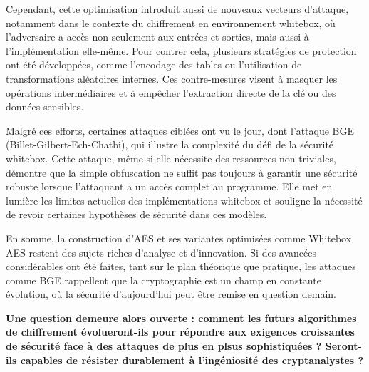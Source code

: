 \documentclass[a4paper, 10pt]{article}
\begin{document}
Cependant, cette optimisation introduit aussi de nouveaux vecteurs d’attaque, notamment dans le contexte du chiffrement en environnement whitebox, où l’adversaire a accès non seulement aux entrées et sorties, mais aussi à l’implémentation elle-même. Pour contrer cela, plusieurs stratégies de protection ont été développées, comme l’encodage des tables ou l’utilisation de transformations aléatoires internes. Ces contre-mesures visent à masquer les opérations intermédiaires et à empêcher l’extraction directe de la clé ou des données sensibles.

Malgré ces efforts, certaines attaques ciblées ont vu le jour, dont l’attaque BGE (Billet-Gilbert-Ech-Chatbi), qui illustre la complexité du défi de la sécurité whitebox. Cette attaque, même si elle nécessite des ressources non triviales, démontre que la simple obfuscation ne suffit pas toujours à garantir une sécurité robuste lorsque l’attaquant a un accès complet au programme. Elle met en lumière les limites actuelles des implémentations whitebox et souligne la nécessité de revoir certaines hypothèses de sécurité dans ces modèles.

En somme, la construction d’AES et ses variantes optimisées comme Whitebox AES restent des sujets riches d’analyse et d’innovation. Si des avancées considérables ont été faites, tant sur le plan théorique que pratique, les attaques comme BGE rappellent que la cryptographie est un champ en constante évolution, où la sécurité d’aujourd’hui peut être remise en question demain. 

\textbf{Une question demeure alors ouverte : comment les futurs algorithmes de chiffrement évolueront-ils pour répondre aux exigences croissantes de sécurité face à des attaques de plus en plsus sophistiquées ? Seront-ils capables de résister durablement à l’ingéniosité des cryptanalystes ?}



 
\end{document}
